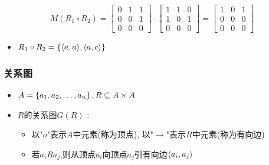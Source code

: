 {{{{    $$
      M(R_1 \circ R_2) = \begin{bmatrix}
        0 & 1 & 1 \\
        0 & 0 & 1 \\
        0 & 0 & 0
      \end{bmatrix}
      \cdot
      \begin{bmatrix}
        1 & 1 & 0 \\
        1 & 0 & 1 \\
        0 & 0 & 0
      \end{bmatrix}
      =
      \begin{bmatrix}
        1 & 0 & 1 \\
        0 & 0 & 0 \\
        0 & 0 & 0
      \end{bmatrix}
    $$
    \begin{itemize}
      \item $R_1 \circ R_2 = \left\{ \langle a,a\rangle,\langle a,c\rangle \right\}$
    \end{itemize}
  }%

  \subsubsection{关系图}{
    \begin{itemize}
      \item $A = \left\{ a_1,a_2,\dots,a_n \right\},R \subseteq A \times A$
      \item {
            $R$的关系图$G(R)$ : \begin{itemize}
              \item 以"$o$"表示$A$中元素(称为顶点), 以"$\rightarrow$"表示$R$中元素(称为有向边)
              \item 若$a_iRa_j$,则从顶点$a_i$向顶点$a_j$引有向边$\langle a_i,a_j\rangle$
            \end{itemize}
            }
    \end{itemize}
  }%

}}}
